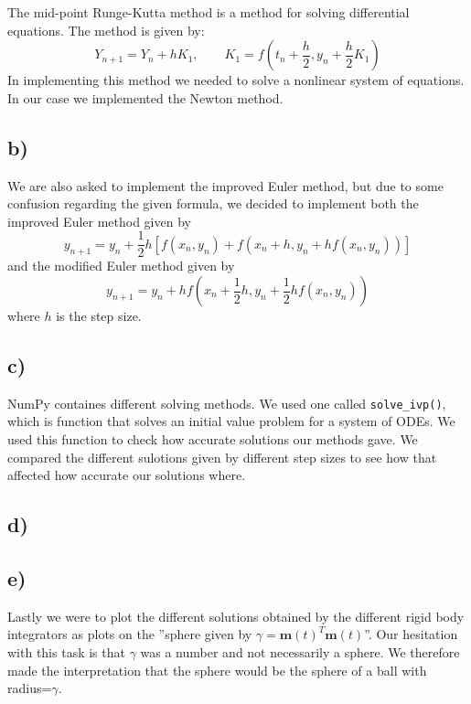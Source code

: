 \documentclass[12pt, a4paper,usenames,dvipsnames]{article}
\renewcommand\vec{\mathbf}
\begin{document}
The mid-point Runge-Kutta method is a method for solving differential equations. The method is given by: 
\[Y_{n+1} = Y_n +  hK_1, \qquad K_1=f(t_n + \frac{h}{2}, y_n+\frac{h}{2}K_1)\]
In implementing this method we needed to solve a nonlinear system of equations. In our case we implemented the Newton method. 


\subsection*{b)}
We are also asked to implement the improved Euler method, but due to some confusion regarding the given formula, we decided to implement both the improved Euler method given by
\[y_{n+1} = y_n + \frac{1}{2}h[f(x_n,y_n) + f(x_n + h, y_n + hf(x_n, y_n))]\]
and the modified Euler method given by
\[y_{n+1} = y_n + hf\left(x_n + \frac{1}{2}h, y_n + \frac{1}{2}hf(x_n, y_n)\right)\]
where $h$ is the step size. 

\subsection*{c)}
\lstset{language=Python}
NumPy containes different solving methods. We used one called \lstinline{solve_ivp()}, which is function that solves an initial value problem for a system of ODEs. We used this function to check how accurate solutions our methods gave. 
We compared the different sulotions given by different step sizes to see how that affected how accurate our solutions where. 

\subsection*{d)}

\subsection*{e)}
Lastly we were to plot the different solutions obtained by the different rigid body integrators as plots on the ''sphere given by $\gamma = \vec{m}(t)^T \vec{m}(t)$''. Our hesitation with this task is that $\gamma$ was a number and not necessarily a sphere. We therefore made the interpretation that the sphere would be the sphere of a ball with radius=$\gamma$.
\end{document}
